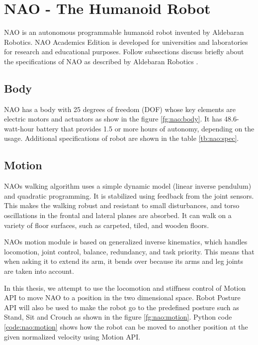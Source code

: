 \section{NAO - The Humanoid Robot} NAO is an autonomous programmable humanoid robot invented by Aldebaran Robotics. NAO Academics Edition is developed for universities and laboratories for research and educational purposes. Follow subsections discuss briefly about the specifications of NAO as described by Aldebaran Robotics \cite{8}.



\subsection{Body} NAO has a body with 25 degrees of freedom (DOF) whose key elements are electric motors and actuators as show in the figure \ref{fg:nao:body}. It has 48.6-watt-hour battery that provides 1.5 or more hours of autonomy, depending on the usage. Additional specifications of robot are shown in the table \ref{tb:nao:spec}. 



\subsection{Motion} NAOs walking algorithm uses a simple dynamic model (linear inverse pendulum) and quadratic programming. It is stabilized using feedback from the joint sensors. This makes the walking robust and resistant to small disturbances, and torso oscillations in the frontal and lateral planes are absorbed. It can walk on a variety of floor surfaces, such as carpeted, tiled, and wooden floors. 

NAOs motion module is based on generalized inverse kinematics, which handles locomotion, joint control, balance, redundancy, and task priority. This means that when asking it to extend its arm, it bends over because its arms and leg joints are taken into account.



In this thesis, we attempt to use the locomotion and stiffness control of Motion API to move NAO to a position in the two dimensional space. Robot Posture API will also be used to make the robot go to the predefined posture such as Stand, Sit and Crouch as shown in the figure \ref{fg:nao:motion}. Python code \ref{code:nao:motion} shows how the robot can be moved to another position at the given normalized velocity using Motion API. 

